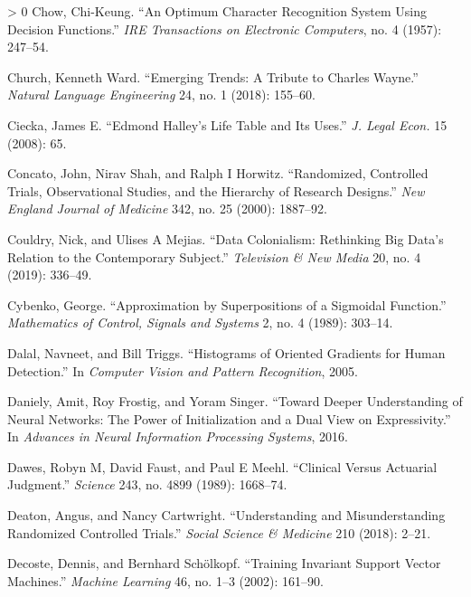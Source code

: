 \documentclass{tufte-book}
\newlength{\cslhangindent}
\newenvironment{CSLReferences}[3] %
 {%
  \setlength{\parindent}{0pt}
  \ifodd #1 \everypar{\setlength{\hangindent}{\cslhangindent}}\ignorespaces\fi
  \ifnum #2 > 0
  \setlength{\parskip}{#3\baselineskip}
  \fi
 }%
 {
 }
\begin{document}
\begin{CSLReferences}{1}{0}
\leavevmode\hypertarget{ref-chow1957optimum}{}%
Chow, Chi-Keung. {``An Optimum Character Recognition System Using
Decision Functions.''} \emph{{IRE} Transactions on Electronic
Computers}, no. 4 (1957): 247--54.

\leavevmode\hypertarget{ref-Church18}{}%
Church, Kenneth Ward. {``Emerging Trends: A Tribute to Charles Wayne.''}
\emph{Natural Language Engineering} 24, no. 1 (2018): 155--60.

\leavevmode\hypertarget{ref-ciecka2008edmond}{}%
Ciecka, James E. {``Edmond Halley's Life Table and Its Uses.''} \emph{J.
Legal Econ.} 15 (2008): 65.

\leavevmode\hypertarget{ref-concato2000randomized}{}%
Concato, John, Nirav Shah, and Ralph I Horwitz. {``Randomized,
Controlled Trials, Observational Studies, and the Hierarchy of Research
Designs.''} \emph{New England Journal of Medicine} 342, no. 25 (2000):
1887--92.

\leavevmode\hypertarget{ref-couldry2019data}{}%
Couldry, Nick, and Ulises A Mejias. {``Data Colonialism: Rethinking Big
Data's Relation to the Contemporary Subject.''} \emph{Television \& New
Media} 20, no. 4 (2019): 336--49.

\leavevmode\hypertarget{ref-cybenko1989approximation}{}%
Cybenko, George. {``Approximation by Superpositions of a Sigmoidal
Function.''} \emph{Mathematics of Control, Signals and Systems} 2, no. 4
(1989): 303--14.

\leavevmode\hypertarget{ref-dalal2005histograms}{}%
Dalal, Navneet, and Bill Triggs. {``Histograms of Oriented Gradients for
Human Detection.''} In \emph{Computer Vision and Pattern Recognition},
2005.

\leavevmode\hypertarget{ref-daniely2016toward}{}%
Daniely, Amit, Roy Frostig, and Yoram Singer. {``Toward Deeper
Understanding of Neural Networks: The Power of Initialization and a Dual
View on Expressivity.''} In \emph{Advances in Neural Information
Processing Systems}, 2016.

\leavevmode\hypertarget{ref-dawes1989clinical}{}%
Dawes, Robyn M, David Faust, and Paul E Meehl. {``Clinical Versus
Actuarial Judgment.''} \emph{Science} 243, no. 4899 (1989): 1668--74.

\leavevmode\hypertarget{ref-deaton2018understanding}{}%
Deaton, Angus, and Nancy Cartwright. {``Understanding and
Misunderstanding Randomized Controlled Trials.''} \emph{Social Science
\& Medicine} 210 (2018): 2--21.

\leavevmode\hypertarget{ref-decoste2002training}{}%
Decoste, Dennis, and Bernhard Schölkopf. {``Training Invariant Support
Vector Machines.''} \emph{Machine Learning} 46, no. 1--3 (2002):
161--90.


\end{CSLReferences}
\end{document}

